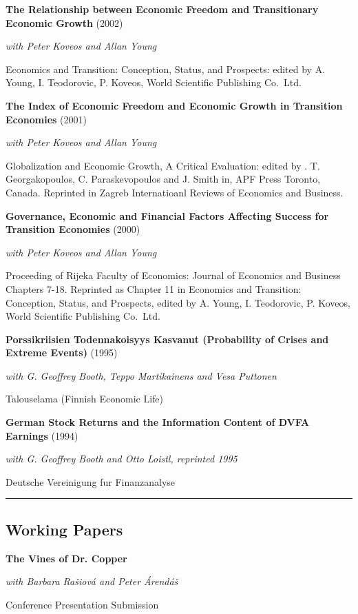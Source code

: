 \documentclass[11pt,a4paper,]{awesome-cv}
\begin{document}
\textbf{The Relationship between Economic Freedom and Transitionary Economic Growth}
(2002)

\textit{with Peter Koveos and Allan Young}

Economics and Transition: Conception, Status, and Prospects: edited by
A. Young, I. Teodorovic, P. Koveos, World Scientific Publishing
Co.~Ltd.~

\textbf{The Index of Economic Freedom and Economic Growth in Transition Economies}
(2001)

\textit{with Peter Koveos and Allan Young}

Globalization and Economic Growth, A Critical Evaluation: edited by . T.
Georgakopoulos, C. Paraskevopoulos and J. Smith in, APF Press Toronto,
Canada. Reprinted in Zagreb Internatioanl Reviews of Economics and
Business.

\textbf{Governance, Economic and Financial Factors Affecting Success for Transition Economies}
(2000)

\textit{with Peter Koveos and Allan Young}

Proceeding of Rijeka Faculty of Economics: Journal of Economics and
Business Chapters 7-18. Reprinted as Chapter 11 in Economics and
Transition: Conception, Status, and Prospects, edited by A. Young, I.
Teodorovic, P. Koveos, World Scientific Publishing Co.~Ltd.~

\textbf{Porssikriisien Todennakoisyys Kasvanut (Probability of Crises and Extreme Events)}
(1995)

\textit{with G. Geoffrey Booth, Teppo Martikainens and Vesa Puttonen}

Talouselama (Finnish Economic Life)

\textbf{German Stock Returns and the Information Content of DVFA Earnings}
(1994)

\textit{with G. Geoffrey Booth and Otto Loistl, reprinted 1995}

Deutsche Vereinigung fur Finanzanalyse

\vspace{0.5cm}\hrule\vspace{0.3cm}
\subsection{Working Papers}

\textbf{The Vines of Dr. Copper}

\textit{with Barbara Rašiová and Peter Árendáš}

Conference Presentation Submission
\end{document}
